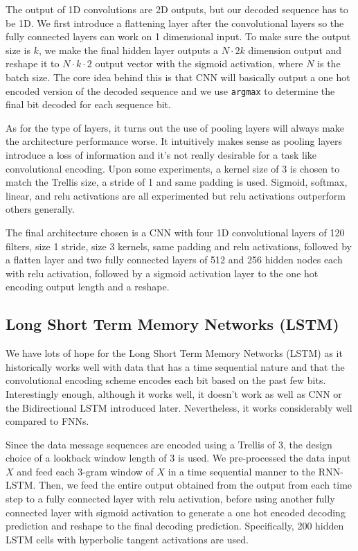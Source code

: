 \documentclass[10pt,twocolumn,letterpaper]{article}
\begin{document}
The output of 1D convolutions are 2D outputs, but our decoded sequence has to be 1D. We first introduce a flattening layer after the convolutional layers so the fully connected layers can work on 1 dimensional input. To make sure the output size is $k$, we make the final hidden layer outputs a $N \cdot 2k$ dimension output and reshape it to $N \cdot k \cdot 2$ output vector with the sigmoid activation, where $N$ is the batch size. The core idea behind this is that CNN will basically output a one hot encoded version of the decoded sequence and we use \texttt{argmax} to determine the final bit decoded for each sequence bit.

As for the type of layers, it turns out the use of pooling layers will always make the architecture performance worse. It intuitively makes sense as pooling layers introduce a loss of information and it's not really desirable for a task like convolutional encoding. Upon some experiments, a kernel size of 3 is chosen to match the Trellis size, a stride of 1 and same padding is used. Sigmoid, softmax, linear, and relu activations are all experimented but relu activations outperform others generally. 

The final architecture chosen is a CNN with four 1D convolutional layers of 120 filters, size 1 stride, size 3 kernels, same padding and relu activations, followed by a flatten layer and two fully connected layers of 512 and 256 hidden nodes each with relu activation, followed by a sigmoid activation layer to the one hot encoding output length and a reshape.

\subsection{Long Short Term Memory Networks (LSTM)}

We have lots of hope for the Long Short Term Memory Networks (LSTM) as it historically works well with data that has a time sequential nature and that the convolutional encoding scheme encodes each bit based on the past few bits. Interestingly enough, although it works well, it doesn't work as well as CNN or the Bidirectional LSTM introduced later. Nevertheless, it works considerably well compared to FNNs.

Since the data message sequences are encoded using a Trellis of 3, the design choice of a lookback window length of 3 is used. We pre-processed the data input $X$ and feed each 3-gram window of $X$ in a time sequential manner to the RNN-LSTM. Then, we feed the entire output obtained from the output from each time step to a fully connected layer with relu activation, before using another fully connected layer with sigmoid activation to generate a one hot encoded decoding prediction and reshape to the final decoding prediction. Specifically, 200 hidden LSTM cells with hyperbolic tangent activations are used.
\end{document}
